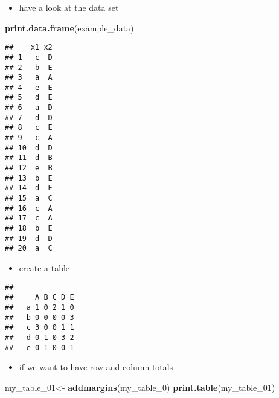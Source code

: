 \documentclass[
]{article}
\newenvironment{Shaded}{\begin{snugshade}}{\end{snugshade}}
\newcommand{\DecValTok}[1]{\textcolor[rgb]{0.00,0.00,0.81}{#1}}
\newcommand{\KeywordTok}[1]{\textcolor[rgb]{0.13,0.29,0.53}{\textbf{#1}}}
\newcommand{\NormalTok}[1]{#1}
\newcommand{\OperatorTok}[1]{\textcolor[rgb]{0.81,0.36,0.00}{\textbf{#1}}}
\newcommand{\StringTok}[1]{\textcolor[rgb]{0.31,0.60,0.02}{#1}}
\providecommand{\tightlist}{%
  \setlength{\itemsep}{0pt}\setlength{\parskip}{0pt}}
\begin{document}
\begin{itemize}
\tightlist
\item
  have a look at the data set
\end{itemize}

\begin{Shaded}
\begin{Highlighting}[]
\KeywordTok{print.data.frame}\NormalTok{(example_data)}
\end{Highlighting}
\end{Shaded}

\begin{verbatim}
##    x1 x2
## 1   c  D
## 2   b  E
## 3   a  A
## 4   e  E
## 5   d  E
## 6   a  D
## 7   d  D
## 8   c  E
## 9   c  A
## 10  d  D
## 11  d  B
## 12  e  B
## 13  b  E
## 14  d  E
## 15  a  C
## 16  c  A
## 17  c  A
## 18  b  E
## 19  d  D
## 20  a  C
\end{verbatim}

\begin{itemize}
\tightlist
\item
  create a table
\end{itemize}

\begin{Shaded}
\end{Shaded}

\begin{verbatim}
##    
##     A B C D E
##   a 1 0 2 1 0
##   b 0 0 0 0 3
##   c 3 0 0 1 1
##   d 0 1 0 3 2
##   e 0 1 0 0 1
\end{verbatim}

\begin{itemize}
\tightlist
\item
  if we want to have row and column totals
\end{itemize}

\begin{Shaded}
\begin{Highlighting}[]
\NormalTok{my_table_}\DecValTok{01}\NormalTok{<-}\StringTok{ }\KeywordTok{addmargins}\NormalTok{(my_table_}\DecValTok{0}\NormalTok{)}
\KeywordTok{print.table}\NormalTok{(my_table_}\DecValTok{01}\NormalTok{)}
\end{Highlighting}
\end{Shaded}
\end{document}
